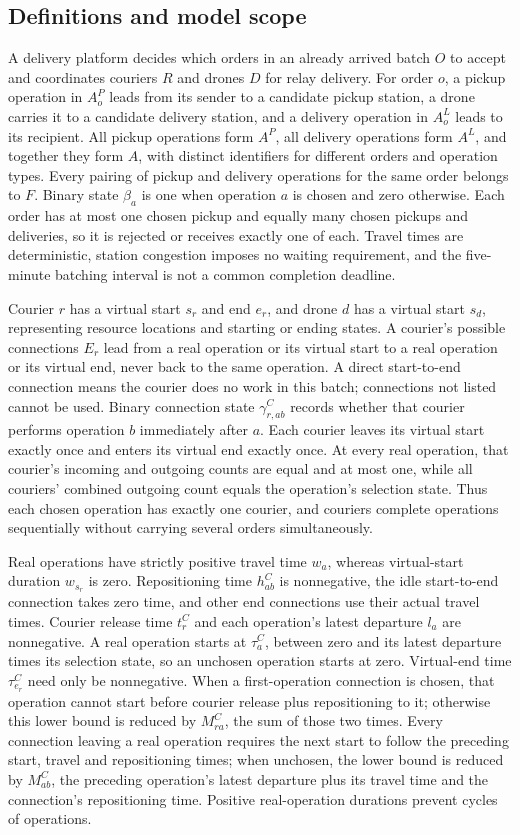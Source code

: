 \documentclass[10pt]{article}
\begin{document}
\subsection*{Definitions and model scope}
A delivery platform decides which orders in an already arrived batch $O$ to accept and coordinates couriers $R$ and drones $D$ for relay delivery. For order $o$, a pickup operation in $A_o^P$ leads from its sender to a candidate pickup station, a drone carries it to a candidate delivery station, and a delivery operation in $A_o^L$ leads to its recipient. All pickup operations form $A^P$, all delivery operations form $A^L$, and together they form $A$, with distinct identifiers for different orders and operation types. Every pairing of pickup and delivery operations for the same order belongs to $F$. Binary state $\beta_a$ is one when operation $a$ is chosen and zero otherwise. Each order has at most one chosen pickup and equally many chosen pickups and deliveries, so it is rejected or receives exactly one of each. Travel times are deterministic, station congestion imposes no waiting requirement, and the five-minute batching interval is not a common completion deadline.

Courier $r$ has a virtual start $s_r$ and end $e_r$, and drone $d$ has a virtual start $s_d$, representing resource locations and starting or ending states. A courier's possible connections $E_r$ lead from a real operation or its virtual start to a real operation or its virtual end, never back to the same operation. A direct start-to-end connection means the courier does no work in this batch; connections not listed cannot be used. Binary connection state $\gamma^C_{r,ab}$ records whether that courier performs operation $b$ immediately after $a$. Each courier leaves its virtual start exactly once and enters its virtual end exactly once. At every real operation, that courier's incoming and outgoing counts are equal and at most one, while all couriers' combined outgoing count equals the operation's selection state. Thus each chosen operation has exactly one courier, and couriers complete operations sequentially without carrying several orders simultaneously.

Real operations have strictly positive travel time $w_a$, whereas virtual-start duration $w_{s_r}$ is zero. Repositioning time $h_{ab}^C$ is nonnegative, the idle start-to-end connection takes zero time, and other end connections use their actual travel times. Courier release time $t_r^C$ and each operation's latest departure $l_a$ are nonnegative. A real operation starts at $\tau_a^C$, between zero and its latest departure times its selection state, so an unchosen operation starts at zero. Virtual-end time $\tau_{e_r}^C$ need only be nonnegative. When a first-operation connection is chosen, that operation cannot start before courier release plus repositioning to it; otherwise this lower bound is reduced by $M_{ra}^C$, the sum of those two times. Every connection leaving a real operation requires the next start to follow the preceding start, travel and repositioning times; when unchosen, the lower bound is reduced by $M_{ab}^C$, the preceding operation's latest departure plus its travel time and the connection's repositioning time. Positive real-operation durations prevent cycles of operations.
\end{document}
